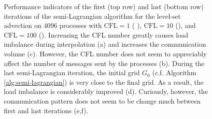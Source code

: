 \begin{figure}[htbp]
\begin{center}
	\end{center}
	\caption{Performance indicators of the first (top row) and last (bottom row) iterations of the semi-Lagrangian algorithm for the level-set advection on 4096 processes with $\text{CFL} = 1$ (  ), $\text{CFL} = 10$ (), and $\text{CFL} = 100$ (). Increasing the CFL number greatly causes load imbalance during interpolation (a) and increases the communication volume (c). However, the CFL number does not seem to appreciably affect the number of messages sent by the processes (b). During the last semi-Lagrangian iteration, the initial grid $G_0$ (c.f. Algorithm \ref{alg:semi-lagrangian}) is very close to the final grid. As a result, the load imbalance is considerably improved (d). Curiously, however, the communication pattern does not seem to be change much between first and last iterations (e,f).}
	\label{fig:communication_4096}
\end{figure}

